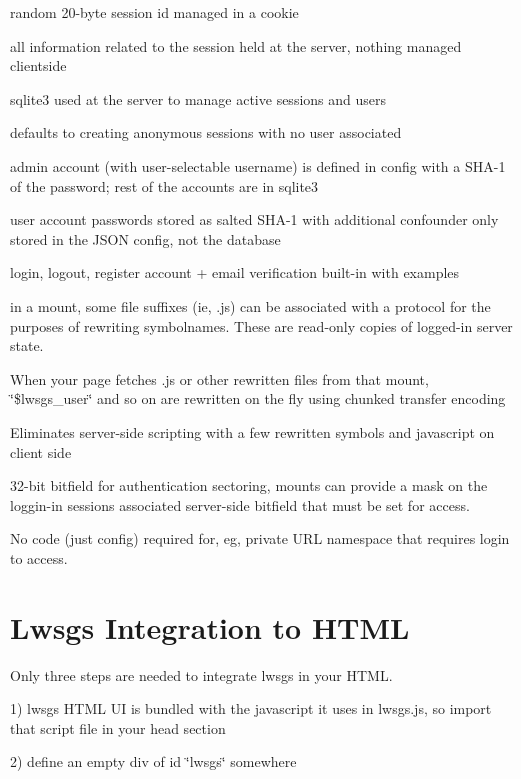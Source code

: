 \begin{DoxyItemize}
\item random 20-\/byte session id managed in a cookie
\item all information related to the session held at the server, nothing managed clientside
\item sqlite3 used at the server to manage active sessions and users
\item defaults to creating anonymous sessions with no user associated
\item admin account (with user-\/selectable username) is defined in config with a S\+H\+A-\/1 of the password; rest of the accounts are in sqlite3
\item user account passwords stored as salted S\+H\+A-\/1 with additional confounder only stored in the J\+S\+ON config, not the database
\item login, logout, register account + email verification built-\/in with examples
\item in a mount, some file suffixes (ie, .js) can be associated with a protocol for the purposes of rewriting symbolnames. These are read-\/only copies of logged-\/in server state.
\item When your page fetches .js or other rewritten files from that mount, \char`\"{}\$lwsgs\+\_\+user\char`\"{} and so on are rewritten on the fly using chunked transfer encoding
\item Eliminates server-\/side scripting with a few rewritten symbols and javascript on client side
\item 32-\/bit bitfield for authentication sectoring, mounts can provide a mask on the loggin-\/in session\textquotesingle{}s associated server-\/side bitfield that must be set for access.
\item No code (just config) required for, eg, private U\+RL namespace that requires login to access.
\end{DoxyItemize}\hypertarget{md_README.generic-sessions_gsin}{}\section{Lwsgs Integration to H\+T\+ML}\label{md_README.generic-sessions_gsin}
Only three steps are needed to integrate lwsgs in your H\+T\+ML.

1) lwsgs H\+T\+ML UI is bundled with the javascript it uses in {\ttfamily lwsgs.\+js}, so import that script file in your head section

2) define an empty div of id \char`\"{}lwsgs\char`\"{} somewhere

